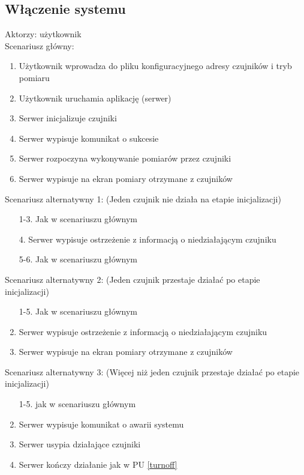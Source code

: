 \documentclass[a4paper,11pt]{article}
\begin{document}
\subsection{Włączenie systemu}
Aktorzy: użytkownik\\
Scenariusz główny:
\begin{enumerate}
   \item Użytkownik wprowadza do pliku konfiguracyjnego adresy czujników i tryb pomiaru
   \item Użytkownik uruchamia aplikację (serwer)
   \item Serwer inicjalizuje czujniki
   \item Serwer wypisuje komunikat o sukcesie
   \item Serwer rozpoczyna wykonywanie pomiarów przez czujniki
   \item Serwer wypisuje na ekran pomiary otrzymane z czujników
\end{enumerate}
Scenariusz alternatywny 1: (Jeden czujnik nie działa na etapie inicjalizacji)
\begin{enumerate}
   \item [1-3.] Jak w scenariuszu głównym
   \item [4.] Serwer wypisuje ostrzeżenie z informacją o niedziałającym czujniku
   \item [5-6.] Jak w scenariuszu głównym
\end{enumerate}
Scenariusz alternatywny 2: (Jeden czujnik przestaje działać po etapie inicjalizacji)
\begin{enumerate}
   \item [1-5.] Jak w scenariuszu głównym
   \setcounter{enumi}{5}
   \item Serwer wypisuje ostrzeżenie z informacją o niedziałającym czujniku
   \item Serwer wypisuje na ekran pomiary otrzymane z czujników
\end{enumerate}
Scenariusz alternatywny 3: (Więcej niż jeden czujnik przestaje działać po etapie inicjalizacji)
\begin{enumerate}
   \item [1-5.] jak w scenariuszu głównym
   \setcounter{enumi}{5}
   \item Serwer wypisuje komunikat o awarii systemu
   \item Serwer usypia działające czujniki
   \item Serwer kończy działanie jak w PU \ref{turnoff}
\end{enumerate}
\end{document}
